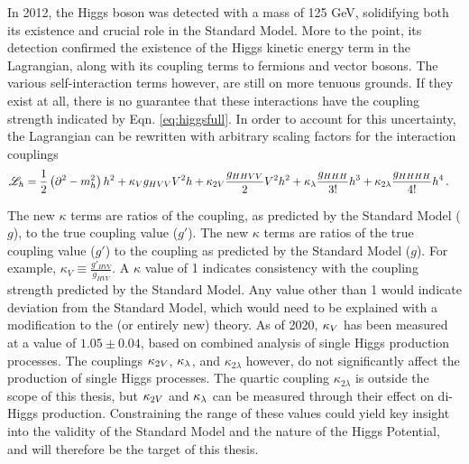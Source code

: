     In 2012, the Higgs boson was detected with a mass of 125 GeV, solidifying both its existence and crucial role in the Standard Model.
    More to the point, its detection confirmed the existence of the Higgs kinetic energy term in the Lagrangian,
        along with its coupling terms to fermions and vector bosons.
    The various self-interaction terms however, are still on more tenuous grounds.
    If they exist at all, there is no guarantee that these interactions have the coupling strength indicated by Eqn. \ref{eq:higgsfull}.
    In order to account for this uncertainty, the Lagrangian can be rewritten with arbitrary scaling factors for the interaction couplings
    \begin{equation} \begin{split} \label{eq:higgskappas}
        \mathscr{L}_h &= \frac{1}{2} \left(\partial^2 - m_h^2 \right) h^2
            + \kappa_{V} g_{HVV} V^2 h + \kappa_{2V} \frac{g_{HHVV}}{2} V^2 h^2
            + \kappa_{\lambda} \frac{g_{HHH}}{3!} h^3 + \kappa_{2\lambda} \frac{g_{HHHH}}{4!} h^4
        \,.
    \end{split} \end{equation}

    The new $\kappa$ terms are ratios of the coupling, as predicted by the Standard Model ($g$), to the true coupling value ($g'$).
    The new $\kappa$ terms are ratios of the true coupling value ($g'$)
        to the coupling as predicted by the Standard Model ($g$).
    For example, $\kappa_V \equiv \frac{g'_{HVV}}{g_{HVV}}$.
    A $\kappa$ value of 1 indicates consistency with the coupling strength predicted by the Standard Model.
    Any value other than 1 would indicate deviation from the Standard Model,
        which would need to be explained with a modification to the (or entirely new) theory.
    As of 2020, $\kappa_{V}$ has been measured at a value of $1.05 \pm 0.04$,
        based on combined analysis of single Higgs production processes\cite{paper:higgs_combined}.
    The couplings $\kappa_{2V}$, $\kappa_{\lambda}$, and $\kappa_{2\lambda}$ however, do not significantly affect the production of single Higgs processes.
    The quartic coupling $\kappa_{2\lambda}$ is outside the scope of this thesis,
        but $\kappa_{2V}$ and $\kappa_{\lambda}$ can be measured through their effect on di-Higgs production.
    Constraining the range of these values could yield key insight into the validity of the Standard Model and the nature of the Higgs Potential,
        and will therefore be the target of this thesis.
